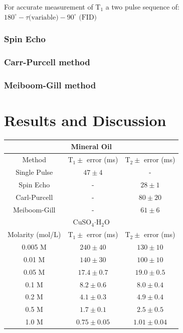 \documentclass[
reprint,
amsmath,amssymb,
aps,
tikz,
border=5pt
]{revtex4-1}
\begin{document}
    For accurate measurement of T$_1$ a two pulse sequence of: $180^{\circ}- \tau \text{(variable)} - 90^{\circ}\text{ (FID)}$

\subsubsection*{Spin Echo}

\subsubsection*{Carr-Purcell method}

\subsubsection*{Meiboom-Gill method}




\section*{Results \lowercase{and} Discussion }




  \begin{tabular}[b]{ |c|c|c| }
    \hline
    \multicolumn{3}{|c|}{Mineral Oil} \\ \hline
     Method & T$_1\pm$ error (ms) & T$_2\pm$ error (ms) \\ \hline
     Single Pulse & $47\pm 4$ & - \\ \hline 
     Spin Echo & - & $28\pm 1$ \\ \hline
     Carl-Purcell & - & $80\pm 20$ \\ \hline 
     Meiboom-Gill & - & $61\pm 6$ \\ \hline
    \multicolumn{3}{|c|}{CuSO$_{4} \boldsymbol{\cdot} $H$_2$O} \\ \hline
    Molarity (mol/L) & T$_1\pm$ error (ms) & T$_2\pm$ error (ms) \\ \hline
    0.005 M & $240\pm 40 $ & $130 \pm 10$ \\ \hline 
    0.01 M & $140 \pm 30$ & $100 \pm 10$ \\ \hline
    0.05 M & $17.4 \pm 0.7 $ & $ 19.0 \pm 0.5$ \\ \hline 
    0.1 M & $8.2 \pm 0.6$ & $8.0 \pm 0.4$ \\ \hline
    0.2 M & $4.1 \pm 0.3$ & $4.9 \pm 0.4$ \\ \hline 
    0.5 M & $1.7 \pm 0.1$ & $2.5 \pm 0.5$ \\ \hline
    1.0 M & $0.75 \pm 0.05$ & $1.01 \pm 0.04$ \\ \hline 
  \end{tabular}
  
\end{document}
